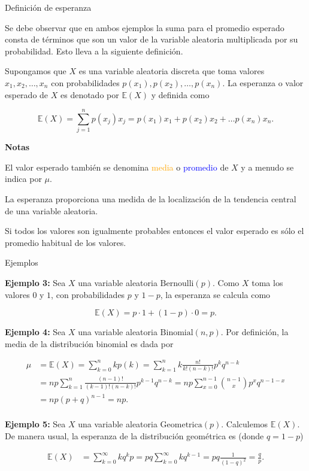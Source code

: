 \documentclass[10pt]{beamer}
\begin{document}
\begin{frame}{Definici\'on de esperanza}
\small{Se debe  observar que en ambos ejemplos la suma para el promedio esperado consta de t\'erminos que son un valor de la variable aleatoria multiplicada por su probabilidad. Esto lleva a la siguiente definici\'on.
	
Supongamos que $X$ es una variable aleatoria discreta que toma valores $x_1, x_2,\dots, x_n$ con probabilidades $p(x_1), p(x_2), \dots, p(x_n)$. La esperanza o valor esperado de $X$ es denotado por $\mathbb{E}(X)$ y definida como}

\[
\mathbb{E}{(X)} = \sum_{j =1}^{n}p(x_j)x_j = p(x_1)x_1 + p(x_2)x_2 + \dots p(x_n)x_n.
\]	
	
\textbf{Notas}

\begin{itemize}
	\scriptsize{
	\item El valor esperado tambi\'en se denomina \textcolor{orange}{media} o \textcolor{blue}{promedio} de $X$ y a menudo se indica por $\mu$.
	\item La esperanza  proporciona una medida de la localizaci\'on de la tendencia central de una variable aleatoria.
	\item Si todos los valores son igualmente probables entonces el valor esperado es s\'olo el promedio habitual de los valores.
}
\end{itemize}
	
\end{frame}

\begin{frame}{Ejemplos }
\scriptsize{ \textbf{Ejemplo 3:} Sea $X$ una variable aleatoria $\text{Bernoulli}(p)$. Como $X$ toma los valores $0$ y $1$, con probabilidades $p$ y $1 -p$, la esperanza se calcula como

\[
\mathbb{E}(X) = p\cdot 1 + (1 -p)\cdot 0 = p. 
\]	

\textbf{Ejemplo 4:} Sea $X$ una variable aleatoria $\text{Binomial}(n, p)$. Por definici\'on, la media de la distribuci\'on binomial es dada por

\begin{align*}
\mu &= \mathbb{E}(X) = \sum_{k = 0}^{n}kp(k) = \sum_{k =1}^{n}k\frac{n!}{k!(n -k)!}p^kq^{n -k} \\
 &= np\sum_{k =1}^{n}\frac{(n -1)!}{(k -1)!(n -k)!}p^{k -1}q^{n -k} = np\sum_{x =0}^{n -1}\binom{n -1}{x}p^xq^{n -1 -x}\\
 &= np(p +q)^{n -1} = np.\\
\end{align*}


\textbf{Ejemplo 5:} Sea $X$ una variable aleatoria $\text{Geometrica}( p)$. Calculemos $\mathbb{E}(X)$. De manera usual, la esperanza de la distribuci\'on geom\'etrica es  (donde  $q = 1 -p$)

\begin{align*}
\mathbb{E}(X) &= \sum_{k =0}^{\infty}kq^{k}p = pq\sum_{k =0}^{\infty}kq^{k -1} = pq\frac{1}{(1 -q)^2} = \frac{q}{p}.
\end{align*}
}
\end{frame}
\end{document}
